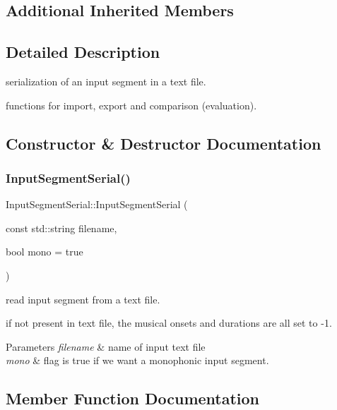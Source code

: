 \subsection*{Additional Inherited Members}


\subsection{Detailed Description}
serialization of an input segment in a text file. 

functions for import, export and comparison (evaluation). 

\subsection{Constructor \& Destructor Documentation}
\mbox{\label{classInputSegmentSerial_a82aef1422a814f19a81b8e15b7979f73}} 
\subsubsection{\texorpdfstring{InputSegmentSerial()}{InputSegmentSerial()}}
{\footnotesize\ttfamily Input\+Segment\+Serial\+::\+Input\+Segment\+Serial (\begin{DoxyParamCaption}\item[{const std\+::string}]{filename,  }\item[{bool}]{mono = {\ttfamily true} }\end{DoxyParamCaption})}



read input segment from a text file. 

if not present in text file, the musical onsets and durations are all set to -\/1. 
\begin{DoxyParams}{Parameters}
{\em filename} & name of input text file \\
\hline
{\em mono} & flag is true if we want a monophonic input segment. \\
\hline
\end{DoxyParams}


\subsection{Member Function Documentation}
\mbox{\label{classInputSegmentSerial_acaa3917f1ab9800b80155b8e1c16270d}} 

